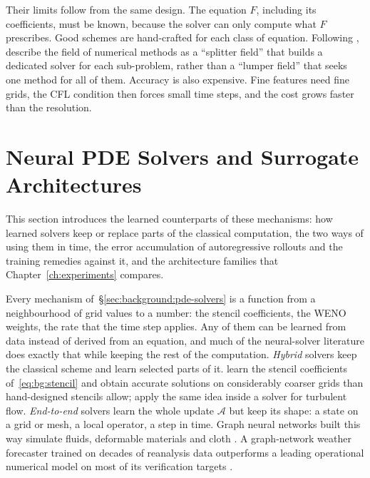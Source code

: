 Their limits follow from the same design. The equation $F$, including its
coefficients, must be known, because the solver can only compute what
$F$ prescribes. Good schemes are hand-crafted for each
class of equation. Following \citet{Bartels2016}, \citet{Brandstetter2022}
describe the field of numerical methods as a ``splitter field'' that
builds a dedicated solver for each sub-problem, rather than a ``lumper
field'' that seeks one method for all of them. Accuracy is also expensive. Fine
features need fine grids, the CFL condition then forces small time steps,
and the cost grows faster than the resolution.


\section{Neural PDE Solvers and Surrogate Architectures}
\label{sec:background:neural-pde}

\label{sec:background:pde-solvers:neural}

This section introduces the learned counterparts of these mechanisms: how
learned solvers keep or replace parts of the classical computation, the
two ways of using them in time, the error accumulation of autoregressive
rollouts and the training remedies against it, and the architecture
families that Chapter~\ref{ch:experiments} compares.

Every mechanism of~\S\ref{sec:background:pde-solvers} is a function from a neighbourhood of grid values
to a number: the stencil coefficients, the WENO weights, the rate that
the time step applies. Any of them can be learned from data instead of
derived from an equation, and much of the neural-solver literature does
exactly that while keeping the rest of the computation. \emph{Hybrid}
solvers keep the classical scheme and learn selected parts of it.
\citet{BarSinai2019} learn the stencil coefficients
of~\eqref{eq:bg:stencil} and obtain accurate solutions on considerably
coarser grids than hand-designed stencils allow; \citet{Kochkov2021}
apply the same idea inside a solver for turbulent flow.
\emph{End-to-end} solvers learn the whole update $\mathcal{A}$ but keep
its shape: a state on a grid or mesh, a local operator, a step in time.
Graph neural networks built this way simulate fluids, deformable
materials and cloth \citep{SanchezGonzalez2020, Pfaff2021}.
A graph-network weather forecaster trained on decades of
reanalysis data outperforms a leading operational numerical model on
most of its verification targets \citep{Lam2023}.

